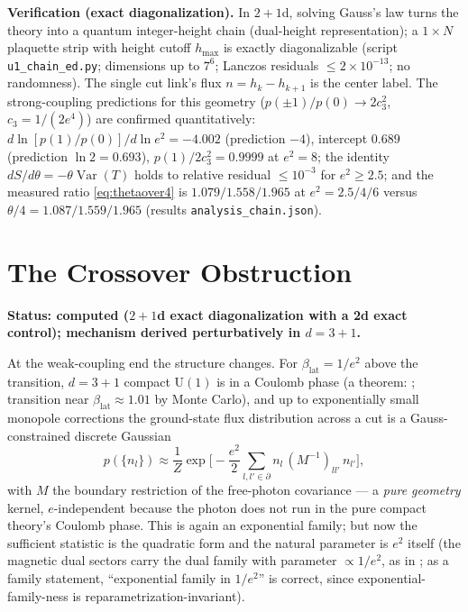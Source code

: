 \documentclass[11pt]{article}
\theoremstyle{remark}
\theoremstyle{plain}
\newcommand{\Var}{\operatorname{Var}}
\begin{document}
\textbf{Verification (exact diagonalization).} In $2{+}1$d, solving Gauss's law turns the theory into a quantum integer-height chain (dual-height representation); a $1 \times N$ plaquette strip with height cutoff $h_{\max}$ is exactly diagonalizable (script \texttt{u1\_chain\_ed.py}; dimensions up to $7^6$; Lanczos residuals $\leq 2\times10^{-13}$; no randomness). The single cut link's flux $n = h_k - h_{k+1}$ is the center label. The strong-coupling predictions for this geometry ($p(\pm1)/p(0) \to 2c_3^2$, $c_3 = 1/(2e^4)$) are confirmed quantitatively: $d\ln[p(1)/p(0)]/d\ln e^2 = -4.002$ (prediction $-4$), intercept $0.689$ (prediction $\ln 2 = 0.693$), $p(1)/2c_3^2 = 0.9999$ at $e^2 = 8$; the identity $dS/d\theta = -\theta \Var(T)$ holds to relative residual $\leq 10^{-3}$ for $e^2 \geq 2.5$; and the measured ratio \eqref{eq:thetaover4} is $1.079 / 1.558 / 1.965$ at $e^2 = 2.5/4/6$ versus $\theta/4 = 1.087 / 1.559 / 1.965$ (results \texttt{analysis\_chain.json}).

\section{The Crossover Obstruction}\label{sec:obstruction}

\textbf{Status: computed ($2{+}1$d exact diagonalization with a 2d exact control); mechanism derived perturbatively in $d=3{+}1$.}

At the weak-coupling end the structure changes. For $\beta_{\mathrm{lat}} = 1/e^2$ above the transition, $d = 3{+}1$ compact $\mathrm{U}(1)$ is in a Coulomb phase (a theorem: \cite{Guth80, FS82}; transition near $\beta_{\mathrm{lat}} \approx 1.01$ by Monte Carlo), and up to exponentially small monopole corrections the ground-state flux distribution across a cut is a Gauss-constrained discrete Gaussian
\begin{equation}\label{eq:gaussian}
p(\{n_l\}) \approx \frac{1}{Z} \exp\Big[ -\frac{e^2}{2} \sum_{l,l' \in \partial} n_l\, (M^{-1})_{ll'}\, n_{l'} \Big],
\end{equation}
with $M$ the boundary restriction of the free-photon covariance --- a \emph{pure geometry} kernel, $e$-independent because the photon does not run in the pure compact theory's Coulomb phase. This is again an exponential family; but now the sufficient statistic is the quadratic form and the natural parameter is $e^2$ itself (the magnetic dual sectors carry the dual family with parameter $\propto 1/e^2$, as in \cite{DW16}; as a family statement, ``exponential family in $1/e^2$'' is correct, since exponential-family-ness is reparametrization-invariant).
\end{document}
